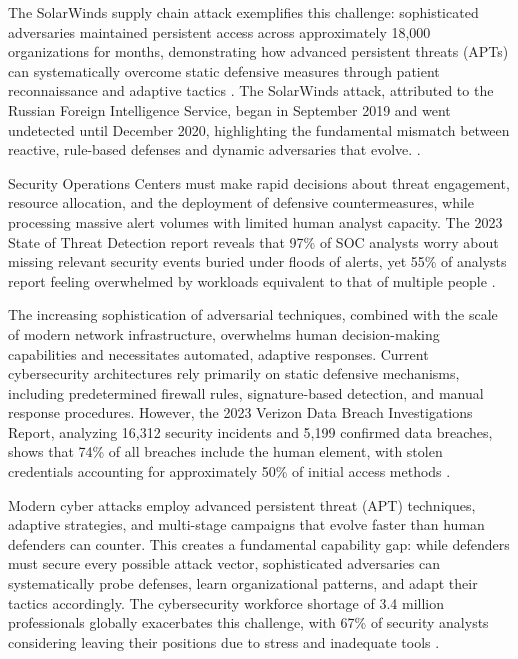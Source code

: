 \documentclass[12pt,oneside]{article}
\begin{document}
The SolarWinds supply chain attack exemplifies this challenge: sophisticated adversaries maintained persistent access across approximately 18,000 organizations for months, demonstrating how advanced persistent threats (APTs) can systematically overcome static defensive measures through patient reconnaissance and adaptive tactics \cite{gao2021solarwinds,npr2021solarwinds}. 
The SolarWinds attack, attributed to the Russian Foreign Intelligence Service, began in September 2019 and went undetected until December 2020, highlighting the fundamental mismatch between reactive, rule-based defenses and dynamic adversaries that evolve. \cite{bitlyft2023solarwinds}.

Security Operations Centers must make rapid decisions about threat engagement, resource allocation, and the deployment of defensive countermeasures, while processing massive alert volumes with limited human analyst capacity. The 2023 State of Threat Detection report reveals that 97\% of SOC analysts worry about missing relevant security events buried under floods of alerts, yet 55\% of analysts report feeling overwhelmed by workloads equivalent to that of multiple people \cite{vectra2023threat}. 

The increasing sophistication of adversarial techniques, combined with the scale of modern network infrastructure, overwhelms human decision-making capabilities and necessitates automated, adaptive responses.
Current cybersecurity architectures rely primarily on static defensive mechanisms, including predetermined firewall rules, signature-based detection, and manual response procedures. However, the 2023 Verizon Data Breach Investigations Report, analyzing 16,312 security incidents and 5,199 confirmed data breaches, shows that 74\% of all breaches include the human element, with stolen credentials accounting for approximately 50\% of initial access methods \cite{verizon2023dbir}. 

Modern cyber attacks employ advanced persistent threat (APT) techniques, adaptive strategies, and multi-stage campaigns that evolve faster than human defenders can counter. This creates a fundamental capability gap: while defenders must secure every possible attack vector, sophisticated adversaries can systematically probe defenses, learn organizational patterns, and adapt their tactics accordingly. The cybersecurity workforce shortage of 3.4 million professionals globally exacerbates this challenge, with 67\% of security analysts considering leaving their positions due to stress and inadequate tools \cite{vectra2023threat}.
\end{document}
